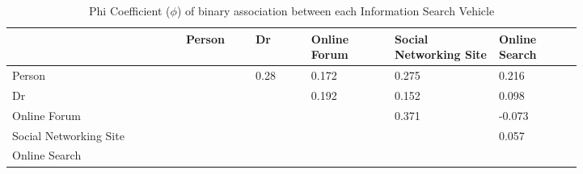 \begin{table}[ht]

\caption{\label{tab:model-2-phi}Phi Coefficient ($\phi$) of binary association between each Information Search Vehicle}
\centering
\begin{tabular}{p{0.25\linewidth} p{0.10\linewidth} p{0.08\linewidth} p{0.12\linewidth} p{0.15\linewidth} p{0.12\linewidth}}
\hline
 & Person & Dr & Online Forum & Social Networking Site & Online Search\\
\hline
Person&\-& 0.28& 0.172& 0.275& 0.216\\

Dr &\-&\-& 0.192 & 0.152 & 0.098\\

Online Forum&\-&\-&\-& 0.371& -0.073\\

Social Networking Site &\-&\-&\-&\-& 0.057\\

Online Search&\-&\-&\-&\-& \\
\hline
\end{tabular}
\end{table}